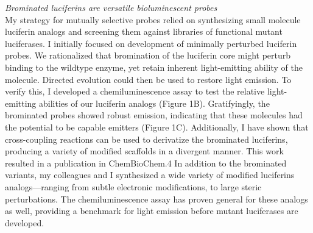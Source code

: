 \documentclass[11pt]{article}
\begin{document}
\textit{Brominated luciferins are versatile bioluminescent probes}\\ %
My strategy for mutually selective probes relied on synthesizing small molecule luciferin analogs and screening them against libraries of functional mutant luciferases. I initially focused on development of minimally perturbed luciferin probes. We rationalized that bromination of the luciferin core might perturb binding to the wildtype enzyme, yet retain inherent light-emitting ability of the molecule. Directed evolution could then be used to restore light emission. To verify this, I developed a chemiluminescence assay to test the relative light-emitting abilities of our luciferin analogs (Figure 1B). Gratifyingly, the brominated probes showed robust emission, indicating that these molecules had the potential to be capable emitters (Figure 1C). Additionally, I have shown that cross-coupling reactions can be used to derivatize the brominated luciferins, producing a variety of modified scaffolds in a divergent manner. This work resulted in a publication in ChemBioChem.4 In addition to the brominated variants, my colleagues and I synthesized a wide variety of modified luciferins analogs—ranging from subtle electronic modifications, to large steric perturbations. The chemiluminescence assay has proven general for these analogs as well, providing a benchmark for light emission before mutant luciferases are developed.
\end{document}
